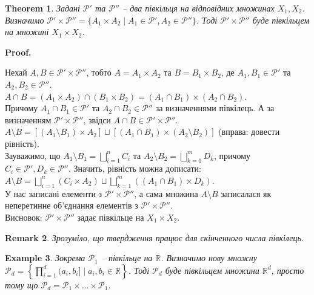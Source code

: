 \documentclass[a4paper, 10pt]{article}
\makeatletter
\theoremstyle{theoremdd}
\newtheorem{theorem}{Theorem}[subsection]
\newtheorem{example}[theorem]{Example}
\newtheorem{remark}[theorem]{Remark}
\renewenvironment{proof}[1][Proof.\\]{\par
\pushQED{\hfill \qed}%
\normalfont \topsep6\p@\@plus6\p@\relax
\trivlist
\item\relax
{\bfseries
#1\@addpunct{.}}\hspace\labelsep\ignorespaces
}{%
\popQED\endtrivlist\@endpefalse
}
\makeatother
\begin{document}
\begin{theorem}
\label{product_of_semirings_is_semiring}
Задані $\mathcal{P}'$ та $\mathcal{P}''$ -- два півкільця на відповідних множинах $X_1,X_2$. Визначимо $\mathcal{P}' \times \mathcal{P}'' = \{ A_1 \times A_2 \mid A_1 \in \mathcal{P}', A_2 \in \mathcal{P}'' \}$. Тоді $\mathcal{P}' \times \mathcal{P}''$ буде півкільцем на множині $X_1 \times X_2$.
\end{theorem}

\begin{proof}
Нехай $A,B \in \mathcal{P}' \times \mathcal{P}''$, тобто $A = A_1 \times A_2$ та $B = B_1 \times B_2$, де $A_1,B_1 \in \mathcal{P}'$ та $A_2,B_2 \in \mathcal{P}''$.\\
$A \cap B = (A_1 \times A_2) \cap (B_1 \times B_2) = (A_1 \cap B_1) \times (A_2 \cap B_2)$.\\
Причому $A_1 \cap B_1 \in \mathcal{P}'$ та $A_2 \cap B_2 \in \mathcal{P}''$ за визначеннями півкілець. А за визначенням $\mathcal{P}' \times \mathcal{P}''$, звідси $A \cap B \in \mathcal{P}' \times \mathcal{P}''$.\\
$A \setminus B = [(A_1 \setminus B_1) \times A_2] \sqcup [(A_1 \cap B_1) \times (A_2 \setminus B_2)]$ (вправа: довести рівність).\\
Зауважимо, що $A_1 \setminus B_1 = \displaystyle\bigsqcup_{i=1}^n C_i$ та $A_2 \setminus B_2 = \displaystyle\bigsqcup_{k=1}^m D_k$, причому $C_i \in \mathcal{P}',D_k \in \mathcal{P}''$. Значить, рівність можна дописати:\\
$A \setminus B = \displaystyle\bigsqcup_{i=1}^n (C_i \times A_2) \sqcup \bigsqcup_{k=1}^m ((A_1 \cap B_1) \times D_k)$.\\
У нас записані елементи з $\mathcal{P}' \times \mathcal{P}''$, а сама множина $A \setminus B$ записалася як неперетинне об'єднання елементів з $\mathcal{P}' \times \mathcal{P}''$.\\
Висновок: $\mathcal{P}' \times \mathcal{P}''$ задає півкільце на $X_1 \times X_2$.
\end{proof}

\begin{remark}
Зрозуміло, що твердження працює для скінченного числа півкілець.
\end{remark}

\begin{example}
Зокрема $\mathcal{P}_1$ -- півкільце на $\mathbb{R}$. Визначимо нову множну $\mathcal{P}_d = \left\{ \displaystyle\prod_{i=1}^d (a_i,b_i] \mid a_i,b_i \in \mathbb{R} \right\}$. Тоді $\mathcal{P}_d$ буде півкільцем множини $\mathbb{R}^d$, просто тому що $\mathcal{P}_d = \mathcal{P}_1 \times \dots \times \mathcal{P}_1$.
\end{example}
\end{document}
